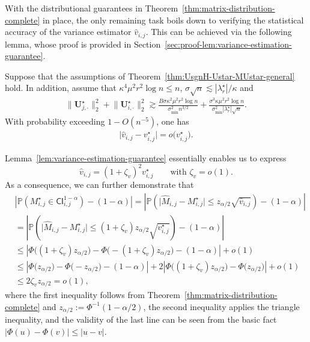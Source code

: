 With the distributional guarantees in Theorem~\ref{thm:matrix-distribution-complete} in place, 
the only remaining task boils down to verifying the statistical accuracy of the variance estimator $\widehat{v}_{i,j}$. 
This can be achieved via the following lemma, whose proof is provided in Section~\ref{sec:proof-lem:variance-estimation-guarantee}.  
%
\begin{lemma}
	\label{lem:variance-estimation-guarantee}
	Suppose that the assumptions of Theorem~\ref{thm:UsgnH-Ustar-MUstar-general} hold. In addition, assume that $\kappa^{4}\mu^{2}r^{2}\log n\leq n$, $\sigma\sqrt{n}\lesssim|\lambda_{r}^{\star}|/\kappa$ and
	\begin{align}
		\big\|\bm{U}_{j,\cdot}^{\star}\big\|_{2}^{2}+\big\|\bm{U}_{i,\cdot}^{\star}\big\|_{2}^{2}\gtrsim\frac{B\sigma\kappa^{2}\mu^{2}r^{2}\log n}{\sigma_{\min}^2 n^{3/2}}+\frac{\sigma^{3}\kappa\mu^{2}r^{2}\log n}{\sigma_{\min}^2|\lambda_{r}^{\star}|\sqrt{n}}. 
		\label{eq:Uj-Ui-lower-bound-lem}
	\end{align}
	With probability exceeding $1-O(n^{-5})$, one has
	\begin{align}
		\big|\widehat{v}_{i,j}-v_{i,j}^{\star}\big| =o\big( v_{i,j}^{\star} \big). 
	\end{align}
\end{lemma}
%

Lemma~\ref{lem:variance-estimation-guarantee} essentially enables us to express
%
\[
	\widehat{v}_{i,j} = (1 + \zeta_v)^2 v_{i,j}^{\star} \qquad \text{with } \zeta_v = o(1). 
\]
%
As a consequence, we can further demonstrate that
%
\begin{align*}
 & \left|\mathbb{P}\left( M_{i,j}^{\star}\in\mathsf{CI}_{i,j}^{1-\alpha}\right) -(1-\alpha)\right|=\left|\mathbb{P}\left( \big| \widehat{M}_{i,j}-M_{i,j}^{\star}\big|\leq z_{\alpha/2}\sqrt{\widehat{v}_{i,j}}\right) -(1-\alpha)\right|\\
 & =\left|\mathbb{P}\left( \big| \widehat{M}_{i,j}-M_{i,j}^{\star}\big|\leq(1+\zeta_{v})z_{\alpha/2}\sqrt{v_{i,j}^{\star}}\right) -(1-\alpha)\right|\\
 & \leq\left|\Phi\big((1+\zeta_{v})z_{\alpha/2}\big)-\Phi\big(-(1+\zeta_{v})z_{\alpha/2}\big)-(1-\alpha)\right|+o(1)\\
 & \leq\left|\Phi\big(z_{\alpha/2}\big)-\Phi\big(-z_{\alpha/2}\big)-(1-\alpha)\right|+2\left|\Phi\big((1+\zeta_{v})z_{\alpha/2}\big)-\Phi\big(z_{\alpha/2}\big)\right|+o(1)\\
 & \leq2\zeta_{v}z_{\alpha/2}=o(1),
\end{align*}
%
where the first inequality follows from Theorem~\ref{thm:matrix-distribution-complete} and $z_{\alpha/2}:= \Phi^{-1}(1-\alpha/2)$, the second inequality applies the triangle inequality, 
and the validity of the last line can be seen from the basic fact $|\Phi(u)-\Phi(v)| \leq |u-v|$.   


